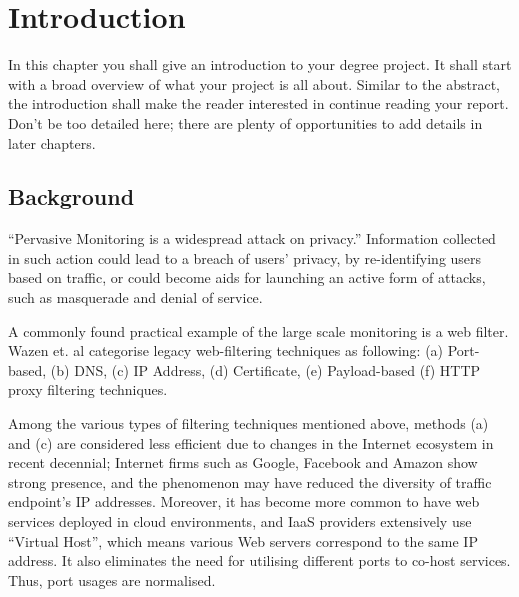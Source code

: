 \documentclass[a4paper,12pt]{article}
\begin{document}
\newpage
{}
\tableofcontents %
\newpage
{}

%
%

\section{Introduction}
In this chapter you shall give an introduction to your degree project. It shall start with a broad overview of what your project is all about. Similar to the abstract, the introduction shall make the reader interested in continue reading your report. Don't be too detailed here; there are plenty of opportunities to add details in later chapters.

\subsection{Background}
``Pervasive Monitoring is a widespread attack on privacy\cite{rfc7258}.'' Information collected in such action could lead to a breach of users’ privacy, by re-identifying users based on traffic\cite{herrmann2010analyzing}, or could become aids for launching an active form of attacks, such as masquerade and denial of service.

A commonly found practical example of the large scale monitoring is a web filter\cite{murdoch2008tools}. Wazen et. al categorise legacy web-filtering techniques as following: (a) Port-based, (b) DNS, (c) IP Address, (d) Certificate, (e) Payload-based (f) HTTP proxy filtering techniques\cite{shbair2015efficiently}.

Among the various types of filtering techniques mentioned above, methods (a) and (c) are considered less efficient due to changes in the Internet ecosystem in recent decennial;
Internet firms such as Google, Facebook and Amazon show strong presence\cite{haucap2014google}, and the phenomenon may have reduced the diversity of traffic endpoint's IP addresses.
Moreover, it has become more common to have web services deployed in cloud environments\cite{clouds2018stat}, and IaaS providers extensively use ``Virtual Host\cite{virtual24host}'', which means various Web servers correspond to the same IP address.
It also eliminates the need for utilising different ports to co-host services. Thus, port usages are normalised.
\end{document}
